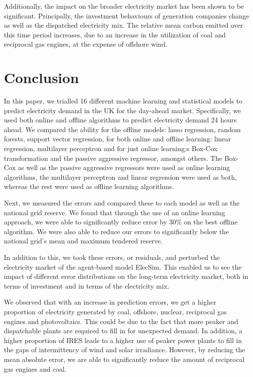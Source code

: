 \documentclass[final,3p,times,twocolumn,numbers]{elsarticle}
\begin{document}
Additionally, the impact on the broader electricity market has been shown to be significant. Principally, the investment behaviours of generation companies change as well as the dispatched electricity mix. The relative mean carbon emitted over this time period increases, due to an increase in the utilization of coal and reciprocal gas engines, at the expense of offshore wind.


\section{Conclusion}
\label{sec:conclusion}

In this paper, we trialled 16 different machine learning and statistical models to predict electricity demand in the UK for the day-ahead market. Specifically, we used both online and offline algorithms to predict electricity demand 24 hours ahead. We compared the ability for the offline models: lasso regression, random forests, support vector regression, for both online and offline learning: linear regression, multilayer perceptron and for just online learning:s Box-Cox transformation and the passive aggressive regressor, amongst others. The Box-Cox as well as the passive aggressive regressors were used as online learning algorithms, the multilayer perceptron and linear regression were used as both, whereas the rest were used as offline learning algorithms.

Next, we measured the errors and compared these to each model as well as the national grid reserve. We found that through the use of an online learning approach, we were able to significantly reduce error by 30\% on the best offline algorithm.  We were also able to reduce our errors to significantly below the national grid's mean and maximum tendered reserve.

In addition to this, we took these errors, or residuals, and perturbed the electricity market of the agent-based model ElecSim. This enabled us to see the impact of different error distributions on the long-term electricity market, both in terms of investment and in terms of the electricity mix.

We observed that with an increase in prediction errors, we get a higher proportion of electricity generated by coal, offshore, nuclear, reciprocal gas engines and photovoltaics. This could be due to the fact that more peaker and dispatchable plants are required to fill in for unexpected demand. In addition, a higher proportion of IRES leads to a higher use of peaker power plants to fill in the gaps of intermittency of wind and solar irradiance. However, by reducing the mean absolute error, we are able to significantly reduce the amount of reciprocal gas engines and coal.
\end{document}
